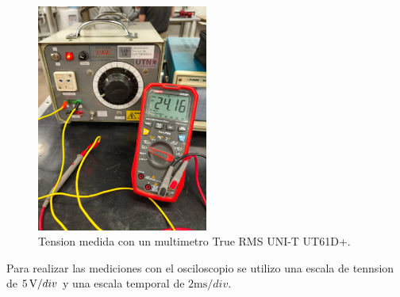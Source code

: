 \documentclass[chaptersright]{informeutn}
\begin{document}
    \begin{figure}[H]
        \centering
        \includegraphics[width=0.5\textwidth]{pictures/tension_fuente_alterna.jpeg}
        \caption{Tension medida con un multimetro True RMS UNI-T UT61D+.}
    \end{figure}

    Para realizar las mediciones con el osciloscopio se utilizo una escala de tennsion de $5\,\mathrm{V}/div$ y una escala
    temporal de $2\text{ms}/div$.
\end{document}
